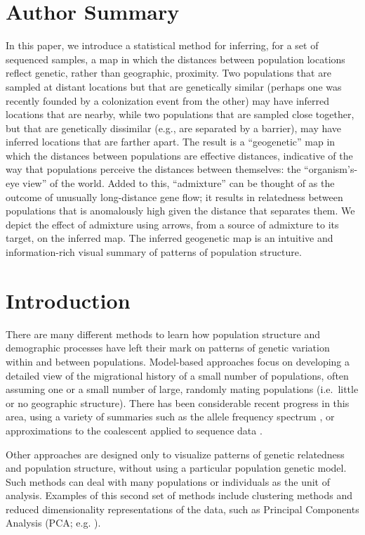 \documentclass[12pt]{article}
\begin{document}
\section*{Author Summary}
In this paper, we introduce a statistical method for inferring, for a set of sequenced samples, 
a map in which the distances between population locations reflect genetic, rather than geographic, proximity.  
Two populations that are sampled at distant locations but that are genetically similar 
(perhaps one was recently founded by a colonization event from the other) 
may have inferred locations that are nearby, while two populations that are sampled close together, 
but that are genetically dissimilar (e.g., are separated by a barrier), may have inferred locations that are farther apart.   
The result is a ``geogenetic'' map in which the distances between populations are effective distances, 
indicative of the way that populations perceive the distances between themselves: the ``organism's-eye view'' of the world.  
Added to this, ``admixture'' can be thought of as the outcome of unusually long-distance gene flow; 
it results in relatedness between populations that is anomalously high given the distance that separates them.
We depict the effect of admixture using arrows, from a source of admixture to its target, on the inferred map.
The inferred geogenetic map is an intuitive and information-rich visual summary of patterns of population structure.

\section*{Introduction}
There are many different methods to learn how population structure and demographic processes have left their mark on 
patterns of genetic variation within and between populations.
Model-based approaches focus on developing a detailed view of the migrational history of a small number of populations,
often assuming one or a small number of large, randomly mating populations (i.e.\ little or no geographic structure).
There has been considerable recent progress in this area, using a variety of summaries such as the allele frequency spectrum \citep{dadi, Bhaskar2014, Excoffier2013}, 
or approximations to the coalescent applied to sequence data \citep{Paul_Song2011, Li_Durbin2011}.

Other approaches are designed only to visualize patterns of genetic relatedness and population structure,
without using a particular population genetic model.
Such methods can deal with many populations or individuals as the unit of analysis. 
Examples of this second set of methods include clustering methods \citep{STRUCTURE, ADMIXTURE, FINESTRUCTURE} 
and reduced dimensionality representations of the data, such as Principal Components Analysis (PCA; e.g. \citep{cavallisforza1994, Patterson2006, price2006eigenstrat}).  
\end{document}

